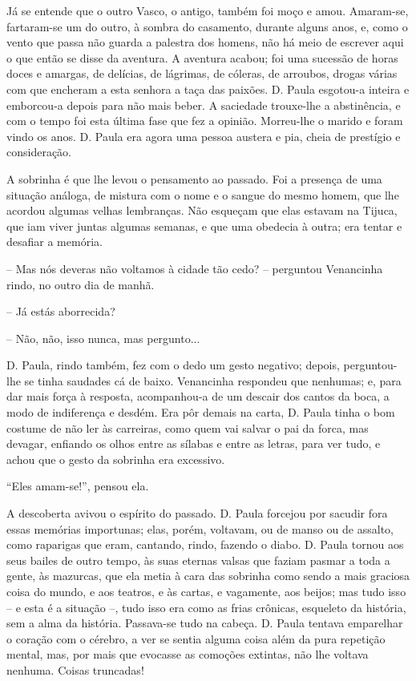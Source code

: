 Já se entende que o outro Vasco, o antigo, também foi moço e amou.
Amaram-se, fartaram-se um do outro, à sombra do casamento, durante
alguns anos, e, como o vento que passa não guarda a palestra dos homens,
não há meio de escrever aqui o que então se disse da aventura. A
aventura acabou; foi uma sucessão de horas doces e amargas, de delícias,
de lágrimas, de cóleras, de arroubos, drogas várias com que encheram a
esta senhora a taça das paixões. D. Paula esgotou-a inteira e emborcou-a
depois para não mais beber. A saciedade trouxe-lhe a abstinência, e com
o tempo foi esta última fase que fez a opinião. Morreu-lhe o marido e
foram vindo os anos. D. Paula era agora uma pessoa austera e pia, cheia
de prestígio e consideração.

A sobrinha é que lhe levou o pensamento ao passado. Foi a presença de
uma situação análoga, de mistura com o nome e o sangue do mesmo homem,
que lhe acordou algumas velhas lembranças. Não esqueçam que elas estavam
na Tijuca, que iam viver juntas algumas semanas, e que uma obedecia à
outra; era tentar e desafiar a memória.

-- Mas nós deveras não voltamos à cidade tão cedo? -- perguntou
Venancinha rindo, no outro dia de manhã.

-- Já estás aborrecida?

-- Não, não, isso nunca, mas pergunto...

D. Paula, rindo também, fez com o dedo um gesto negativo; depois,
perguntou-lhe se tinha saudades cá de baixo. Venancinha respondeu que
nenhumas; e, para dar mais força à resposta, acompanhou-a de um descair
dos cantos da boca, a modo de indiferença e desdém. Era pôr demais na
carta, D. Paula tinha o bom costume de não ler às carreiras, como quem
vai salvar o pai da forca, mas devagar, enfiando os olhos entre as
sílabas e entre as letras, para ver tudo, e achou que o gesto da
sobrinha era excessivo.

``Eles amam-se!'', pensou ela.

A descoberta avivou o espírito do passado. D. Paula forcejou por sacudir
fora essas memórias importunas; elas, porém, voltavam, ou de manso ou de
assalto, como raparigas que eram, cantando, rindo, fazendo o diabo. D.
Paula tornou aos seus bailes de outro tempo, às suas eternas valsas que
faziam pasmar a toda a gente, às mazurcas, que ela metia à cara das
sobrinha como sendo a mais graciosa coisa do mundo, e aos teatros, e às
cartas, e vagamente, aos beijos; mas tudo isso -- e esta é a situação
--, tudo isso era como as frias crônicas, esqueleto da história, sem a
alma da história. Passava-se tudo na cabeça. D. Paula tentava emparelhar
o coração com o cérebro, a ver se sentia alguma coisa além da pura
repetição mental, mas, por mais que evocasse as comoções extintas, não
lhe voltava nenhuma. Coisas truncadas!

